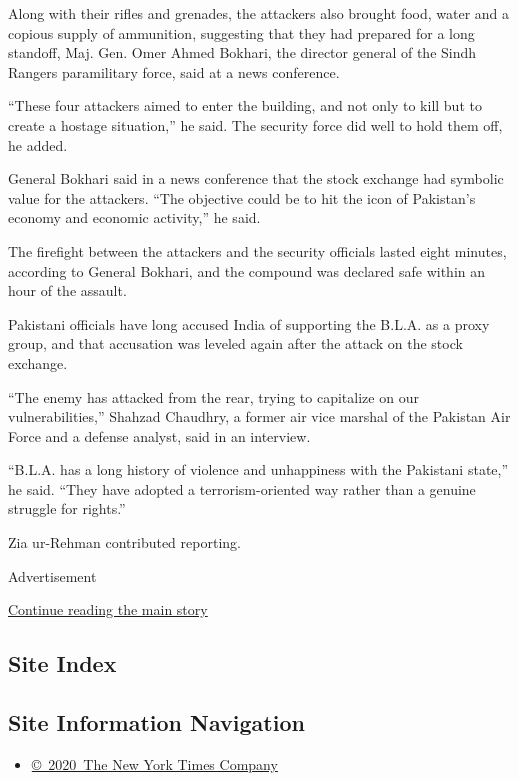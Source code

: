 Along with their rifles and grenades, the attackers also brought food,
water and a copious supply of ammunition, suggesting that they had
prepared for a long standoff, Maj. Gen. Omer Ahmed Bokhari, the director
general of the Sindh Rangers paramilitary force, said at a news
conference.

``These four attackers aimed to enter the building, and not only to kill
but to create a hostage situation,'' he said. The security force did
well to hold them off, he added.

General Bokhari said in a news conference that the stock exchange had
symbolic value for the attackers. ``The objective could be to hit the
icon of Pakistan's economy and economic activity,'' he said.

The firefight between the attackers and the security officials lasted
eight minutes, according to General Bokhari, and the compound was
declared safe within an hour of the assault.

Pakistani officials have long accused India of supporting the B.L.A. as
a proxy group, and that accusation was leveled again after the attack on
the stock exchange.

``The enemy has attacked from the rear, trying to capitalize on our
vulnerabilities,'' Shahzad Chaudhry, a former air vice marshal of the
Pakistan Air Force and a defense analyst, said in an interview.

``B.L.A. has a long history of violence and unhappiness with the
Pakistani state,'' he said. ``They have adopted a terrorism-oriented way
rather than a genuine struggle for rights.''

Zia ur-Rehman contributed reporting.

Advertisement

\protect\hyperlink{after-bottom}{Continue reading the main story}

\hypertarget{site-index}{%
\subsection{Site Index}\label{site-index}}

\hypertarget{site-information-navigation}{%
\subsection{Site Information
Navigation}\label{site-information-navigation}}

\begin{itemize}
\tightlist
\item
  \href{https://help.nytimes.com/hc/en-us/articles/115014792127-Copyright-notice}{©~2020~The
  New York Times Company}
\end{itemize}

